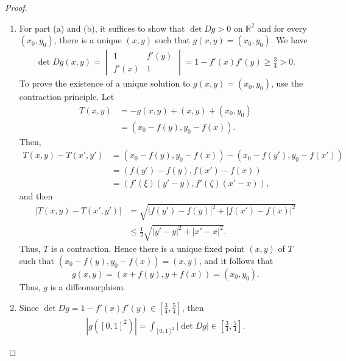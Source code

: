 \documentclass[11pt]{article}
\theoremstyle{definition}
\theoremstyle{definition}
\begin{document}
\begin{proof}
~\begin{enumerate}[label=(\alph*)]
    \item For part (a) and (b), it suffices to show that $\det Dg > 0$ on $\mathbb{R}^2$ and for every $(x_0, y_0)$, there is a unique $(x,y)$ such that $g(x,y) = (x_0, y_0)$. We have
    \begin{align*}
        \det Dg(x,y) = \begin{vmatrix}
            1 & f'(y) \\
            f'(x) & 1
        \end{vmatrix} = 1 - f'(x)f'(y) \geq \frac{3}{4} > 0.
    \end{align*}
    To prove the existence of a unique solution to $g(x,y) = (x_0, y_0)$, use the contraction principle. Let
    \begin{align*}
        T(x,y) & = - g(x,y) + (x,y) + (x_0, y_0) \\
        & = (x_0-f(y), y_0-f(x)).
    \end{align*}
    Then,
    \begin{align*}
        T(x,y) - T(x',y') & = (x_0-f(y), y_0-f(x)) - (x_0-f(y'), y_0-f(x')) \\
        & = (f(y') - f(y), f(x') - f(x)) \\
        & = \left(f'(\xi)(y'-y), f'(\zeta)(x'-x)\right),
    \end{align*}
    and then 
    \begin{align*}
        \left|T(x,y) - T(x',y')\right| & = \sqrt{|f(y') - f(y)|^2 + |f(x') - f(x)|^2} \\
        & \leq \frac{1}{2} \sqrt{|y' - y|^2 + |x' - x|^2}.
    \end{align*}
    Thus, $T$ is a contraction. Hence there is a unique fixed point $(x,y)$ of $T$ such that $(x_0-f(y), y_0-f(x)) = (x,y)$, and it follows that $$g(x,y) = (x+f(y), y+f(x)) = (x_0, y_0).$$ Thus, $g$ is a diffeomorphism.
    
    \setcounter{enumi}{2}
    \item Since $\det Dg = 1 - f'(x)f'(y) \in \left[\frac{3}{4}, \frac{5}{4}\right]$, then
    \begin{align*}
        \left|g([0,1]^2)\right| = \int_{[0,1]^2} |\det Dg| \in \left[\frac{3}{4}, \frac{5}{4}\right].
    \end{align*}
\end{enumerate}
\end{proof}


\medskip
\end{document}
